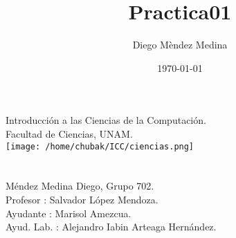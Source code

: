 \documentclass{article}
\title{Practica01 }
\date {\today }
\author{Diego Mèndez Medina }
\begin{document}
   
\begin{center}
  
 
   {\fontsize{23}{0}\selectfont Introducción a las Ciencias de la Computación.}
  \\
  {\fontsize{23}{0}\selectfont Facultad de Ciencias, UNAM. }
  \\
  \texttt{[image: /home/chubak/ICC/ciencias.png]}\\
  \\
 {\fontsize{21}{0}\selectfont {}} 
 \\
 {\fontsize{20}{0}\selectfont 
  Méndez Medina Diego, Grupo 702.  \\    }
Profesor : 	Salvador López Mendoza. \\	
Ayudante :	Marisol Amezcua. \\
Ayud. Lab. : 	Alejandro Iabin Arteaga Hernández.	
\end{center}
\end{document}
